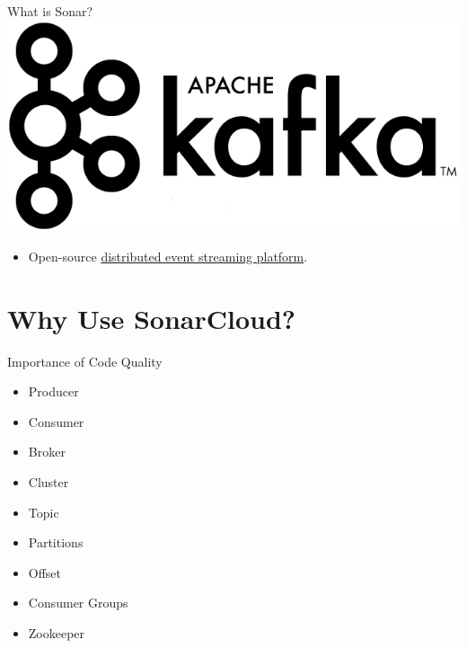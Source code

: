 \documentclass{beamer}
\begin{document}
\begin{frame}{What is Sonar?}
  \includegraphics[scale=0.25]{fig/kafka_logo.png}
  \vspace*{2em}
  \begin{itemize}
    \item Open-source \underline{distributed event streaming platform}.
  \end{itemize}
\end{frame}


\section[Why Use SonarCloud?]{Why Use SonarCloud?}

\begin{frame}{Importance of Code Quality}
  \begin{itemize}
    \item Producer
    \item Consumer
    \item Broker
    \item Cluster
    \item Topic
    \item Partitions
    \item Offset
    \item Consumer Groups
    \item Zookeeper
  \end{itemize}
\end{frame}
\end{document}
